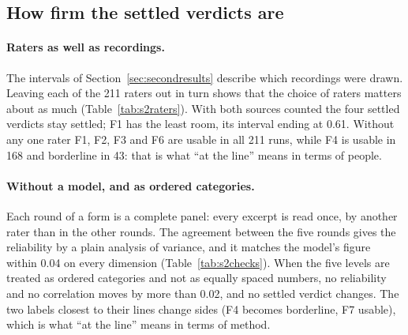 \subsection{How firm the settled verdicts are}\label{sec:firm}

\begin{table}[!htb]\centering
\caption{Standard errors of the primary figures from the choice of recordings (resampling) and of raters (each
rater left out in turn), the 95\% interval from recordings alone and from both, and whether the verdict is
settled with both. The two sources overlap in part, so the interval with both is on the wide
side.}\label{tab:s2raters}

\end{table}

\paragraph{Raters as well as recordings.} The intervals of Section~\ref{sec:secondresults} describe which
recordings were drawn. Leaving each of the 211 raters out in turn shows that the choice of raters matters about
as much (Table~\ref{tab:s2raters}). With both sources counted the four settled verdicts stay settled; F1 has
the least room, its interval ending at 0.61. Without any one rater F1, F2, F3 and F6 are usable in all 211 runs,
while F4 is usable in 168 and borderline in 43: that is what ``at the line'' means in terms of people.

\begin{table}[!htb]\centering
\caption{Checks of the composite's reliability. Levels taken out: as analysed, and with every rating replaced by
the normal score of its level. Levels left in: from the five rounds of a form taken as five separate panels of
one rater per excerpt, which needs no statistical model; from the variances of the model; and the first study's
figure for the four dimensions that had two markers there. Last column: the verdict when the whole analysis is
run on normal scores.}\label{tab:s2checks}

\end{table}

\paragraph{Without a model, and as ordered categories.} Each round of a form is a complete panel: every excerpt
is read once, by another rater than in the other rounds. The agreement between the five rounds gives the
reliability by a plain analysis of variance, and it matches the model's figure within 0.04 on every dimension
(Table~\ref{tab:s2checks}). When the five levels are treated as ordered categories and not as equally spaced
numbers, no reliability and no correlation moves by more than 0.02, and no settled verdict changes. The two
labels closest to their lines change sides (F4 becomes borderline, F7 usable), which is what ``at the line''
means in terms of method.

